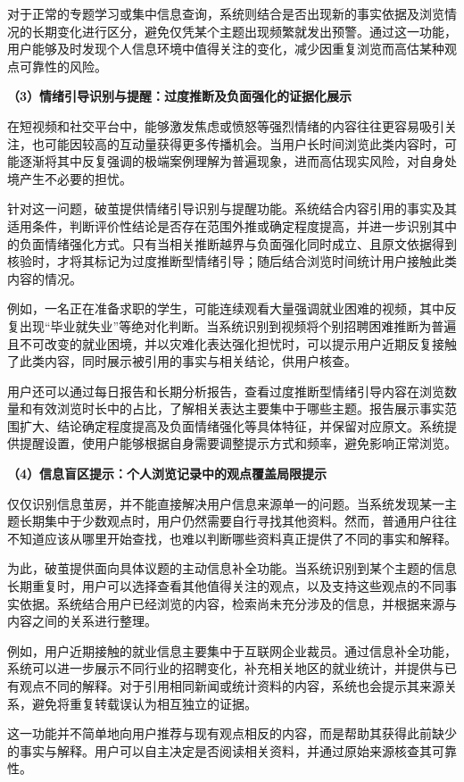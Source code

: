 对于正常的专题学习或集中信息查询，系统则结合是否出现新的事实依据及浏览情况的长期变化进行区分，避免仅凭某个主题出现频繁就发出预警。通过这一功能，用户能够及时发现个人信息环境中值得关注的变化，减少因重复浏览而高估某种观点可靠性的风险。

\textbf{（3）情绪引导识别与提醒：过度推断及负面强化的证据化展示}

在短视频和社交平台中，能够激发焦虑或愤怒等强烈情绪的内容往往更容易吸引关注，也可能因较高的互动量获得更多传播机会。当用户长时间浏览此类内容时，可能逐渐将其中反复强调的极端案例理解为普遍现象，进而高估现实风险，对自身处境产生不必要的担忧。

针对这一问题，破茧提供情绪引导识别与提醒功能。系统结合内容引用的事实及其适用条件，判断评价性结论是否存在范围外推或确定程度提高，并进一步识别其中的负面情绪强化方式。只有当相关推断越界与负面强化同时成立、且原文依据得到核验时，才将其标记为过度推断型情绪引导；随后结合浏览时间统计用户接触此类内容的情况。

例如，一名正在准备求职的学生，可能连续观看大量强调就业困难的视频，其中反复出现``毕业就失业''等绝对化判断。当系统识别到视频将个别招聘困难推断为普遍且不可改变的就业困境，并以灾难化表达强化担忧时，可以提示用户近期反复接触了此类内容，同时展示被引用的事实与相关结论，供用户核查。

用户还可以通过每日报告和长期分析报告，查看过度推断型情绪引导内容在浏览数量和有效浏览时长中的占比，了解相关表达主要集中于哪些主题。报告展示事实范围扩大、结论确定程度提高及负面情绪强化等具体特征，并保留对应原文。系统提供提醒设置，使用户能够根据自身需要调整提示方式和频率，避免影响正常浏览。

\textbf{（4）信息盲区提示：个人浏览记录中的观点覆盖局限提示}

仅仅识别信息茧房，并不能直接解决用户信息来源单一的问题。当系统发现某一主题长期集中于少数观点时，用户仍然需要自行寻找其他资料。然而，普通用户往往不知道应该从哪里开始查找，也难以判断哪些资料真正提供了不同的事实和解释。

为此，破茧提供面向具体议题的主动信息补全功能。当系统识别到某个主题的信息长期重复时，用户可以选择查看其他值得关注的观点，以及支持这些观点的不同事实依据。系统结合用户已经浏览的内容，检索尚未充分涉及的信息，并根据来源与内容之间的关系进行整理。

例如，用户近期接触的就业信息主要集中于互联网企业裁员。通过信息补全功能，系统可以进一步展示不同行业的招聘变化，补充相关地区的就业统计，并提供与已有观点不同的解释。对于引用相同新闻或统计资料的内容，系统也会提示其来源关系，避免将重复转载误认为相互独立的证据。

这一功能并不简单地向用户推荐与现有观点相反的内容，而是帮助其获得此前缺少的事实与解释。用户可以自主决定是否阅读相关资料，并通过原始来源核查其可靠性。

